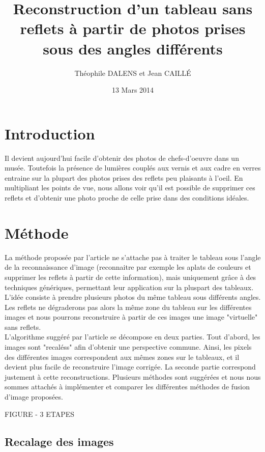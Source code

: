 \documentclass[12pt,a4paper]{article}
\title{Reconstruction d'un tableau sans reflets à partir de photos prises sous des angles différents}
\date{13 Mars 2014}
\author{Théophile DALENS et Jean CAILLÉ}
\begin{document}
\maketitle

\section{Introduction}
Il devient aujourd'hui facile d'obtenir des photos de chefs-d'oeuvre dans un musée. Toutefois la présence de lumières couplés aux vernis et aux cadre en verres entraine sur la plupart des photos prises des reflets peu plaisants à l'oeil. En multipliant les points de vue, nous allons voir qu'il est possible de supprimer ces reflets et d'obtenir une photo proche de celle prise dans des conditions idéales.

\section{Méthode}

La méthode proposée par l'article ne s'attache pas à traiter le tableau sous l'angle de la reconnaissance d'image (reconnaitre par exemple les aplats de couleurs et supprimer les reflets à partir de cette information), mais uniquement grâce à des techniques génériques, permettant leur application sur la pluspart des tableaux. L'idée consiste à prendre plusieurs photos du même tableau sous différents angles. Les reflets ne dégraderons pas alors la même zone du tableau sur les différentes images et nous pourrons reconstruire à partir de ces images une image "virtuelle" sans reflets.\\

L'algorithme suggéré par l'article se décompose en deux parties. Tout d'abord, les images sont "recaléss" afin d'obtenir une perspective commune. Ainsi, les pixels des différentes images correspondent aux mêmes zones sur le tableaux, et il devient plus facile de reconstruire l'image corrigée. La seconde partie correspond justement à cette reconstructions. Plusieurs méthodes sont suggérées et nous nous sommes attachés à implémenter et comparer les différentes méthodes de fusion d'image proposées.

FIGURE - 3 ETAPES

\subsection{Recalage des images}
\end{document}
